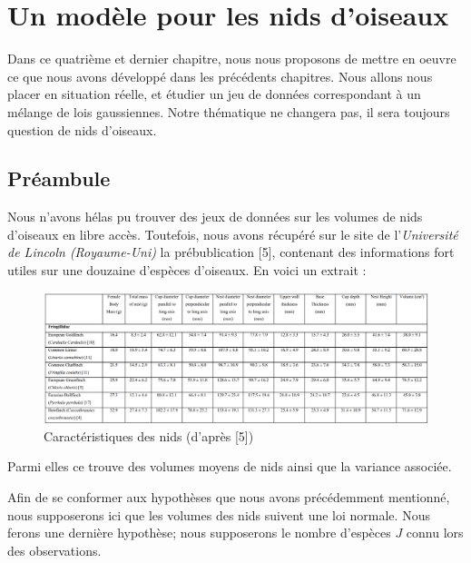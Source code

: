 \documentclass[frenchb]{report}
\newcommand{\1}{\mathbbm{1}}
\theoremstyle{definition}\newtheorem{defn}{Définition}
\theoremstyle{definition}\newtheorem{exm}{Exemple}
\theoremstyle{definition}\newtheorem{nota}{Notation}
\theoremstyle{definition}\newtheorem{rem}{Remarque}
\begin{document}
\chapter{Un modèle pour les nids d'oiseaux}

Dans ce quatrième et dernier chapitre, nous nous proposons de mettre en oeuvre ce que nous avons développé dans les précédents chapitres. Nous allons nous placer en situation réelle, et étudier un jeu de données correspondant à un mélange de lois gaussiennes. Notre thématique ne changera pas, il sera toujours question de nids d'oiseaux. 

\section{Préambule}

Nous n'avons hélas pu trouver des jeux de données sur les volumes de nids d'oiseaux en libre accès. Toutefois, nous avons récupéré sur le site de l'\textit{Université de Lincoln (Royaume-Uni)} la prébublication [5], contenant des informations fort utiles sur une douzaine d'espèces d'oiseaux.
En voici un extrait :
\begin{figure}[H]
\centering
\includegraphics[scale = 0.5]{tab_oiseaux.png}
\caption{Caractéristiques des nids (d'après [5])}
\end{figure}

Parmi elles ce trouve des volumes moyens de nids ainsi que la variance associée. \newline


Afin de se conformer aux hypothèses que nous avons précédemment mentionné, nous supposerons ici que les volumes des nids suivent une loi normale. Nous ferons une dernière hypothèse; nous supposerons le nombre d'espèces $J$ connu lors des observations. \newline
\end{document}
